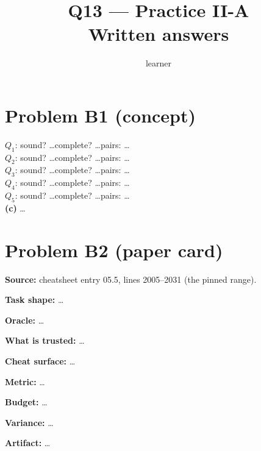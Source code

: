 \documentclass[11pt]{article}
\title{Q13 --- Practice II-A \\ \large Written answers}
\author{learner}
\date{}
\begin{document}
\maketitle

\section*{Problem B1 (concept)}\label{ans:B1}
\begin{answer}
$Q_1$: sound? \dots \quad complete? \dots \quad pairs: \dots \\
$Q_2$: sound? \dots \quad complete? \dots \quad pairs: \dots \\
$Q_3$: sound? \dots \quad complete? \dots \quad pairs: \dots \\
$Q_4$: sound? \dots \quad complete? \dots \quad pairs: \dots \\
$Q_5$: sound? \dots \quad complete? \dots \quad pairs: \dots \\
\textbf{(c)} \dots
\end{answer}

\section*{Problem B2 (paper card)}\label{ans:B2}
\begin{answer}
\textbf{Source:} cheatsheet entry 05.5, lines 2005--2031 (the pinned range).

\textbf{Task shape:} \dots

\textbf{Oracle:} \dots

\textbf{What is trusted:} \dots

\textbf{Cheat surface:} \dots

\textbf{Metric:} \dots

\textbf{Budget:} \dots

\textbf{Variance:} \dots

\textbf{Artifact:} \dots
\end{answer}
\end{document}
